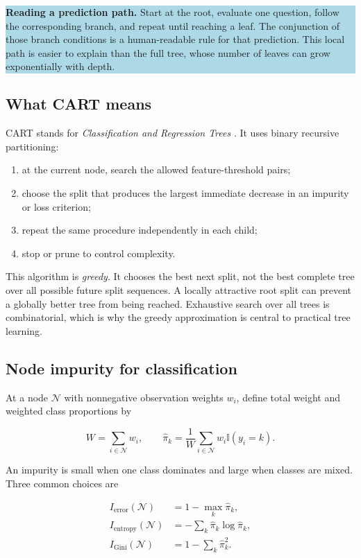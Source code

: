 \documentclass[11pt]{article}
\newcommand{\ind}{\mathbb{1}}
\newcommand{\aside}[1]{\colorbox{lightblue}{\parbox{0.96\linewidth}{#1}}}
\renewcommand{\ind}{\mathbb{I}}
\begin{document}
\aside{\textbf{Reading a prediction path.} Start at the root, evaluate one
question, follow the corresponding branch, and repeat until reaching a leaf.
The conjunction of those branch conditions is a human-readable rule for that
prediction. This local path is easier to explain than the full tree, whose
number of leaves can grow exponentially with depth.}

\subsection{What CART means}

CART stands for \emph{Classification and Regression Trees} \cite{cart}. It uses
binary recursive partitioning:

\begin{enumerate}
\item at the current node, search the allowed feature-threshold pairs;
\item choose the split that produces the largest immediate decrease in an
impurity or loss criterion;
\item repeat the same procedure independently in each child;
\item stop or prune to control complexity.
\end{enumerate}

This algorithm is \emph{greedy}. It chooses the best next split, not the best
complete tree over all possible future split sequences. A locally attractive
root split can prevent a globally better tree from being reached. Exhaustive
search over all trees is combinatorial, which is why the greedy approximation is
central to practical tree learning.

\subsection{Node impurity for classification}

At a node $\mathcal N$ with nonnegative observation weights $w_i$, define total
weight and weighted class proportions by

\[
 W=\sum_{i\in\mathcal N}w_i,
 \qquad
 \hat\pi_k=\frac{1}{W}\sum_{i\in\mathcal N}w_i\ind(y_i=k).
\]

An impurity is small when one class dominates and large when classes are mixed.
Three common choices are

\begin{align*}
 I_{\mathrm{error}}(\mathcal N)&=1-\max_k\hat\pi_k,\\
 I_{\mathrm{entropy}}(\mathcal N)&=-\sum_k\hat\pi_k\log\hat\pi_k,\\
 I_{\mathrm{Gini}}(\mathcal N)&=1-\sum_k\hat\pi_k^2.
\end{align*}
\end{document}
